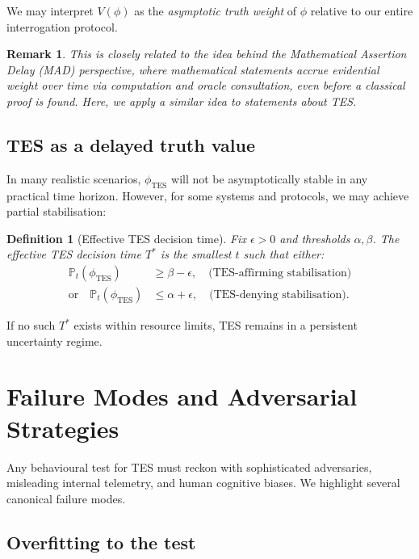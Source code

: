 \documentclass[11pt]{article}
\newtheorem{definition}{Definition}
\newtheorem{remark}{Remark}
\newcommand{\Pp}{\mathbb{P}}
\newcommand{\1}{\mathbf{1}}
\begin{document}
We may interpret $V(\phi)$ as the \emph{asymptotic truth weight} of $\phi$
relative to our entire interrogation protocol.

\begin{remark}
This is closely related to the idea behind the \emph{Mathematical Assertion
Delay} (MAD) perspective, where mathematical statements accrue evidential
weight over time via computation and oracle consultation, even before a
classical proof is found.
Here, we apply a similar idea to statements about TES.
\end{remark}

\subsection{TES as a delayed truth value}

In many realistic scenarios, $\phi_{\text{TES}}$ will not be asymptotically
stable in any practical time horizon.
However, for some systems and protocols, we may achieve partial stabilisation:

\begin{definition}[Effective TES decision time]
Fix $\epsilon > 0$ and thresholds $\alpha, \beta$.
The \emph{effective TES decision time} $T^*$ is the smallest $t$ such that
either:
\begin{align*}
  \Pp_t(\phi_{\text{TES}}) &\ge \beta - \epsilon,
  \quad\text{(TES-affirming stabilisation)}\\
  \text{or}\quad
  \Pp_t(\phi_{\text{TES}}) &\le \alpha + \epsilon,
  \quad\text{(TES-denying stabilisation).}
\end{align*}
\end{definition}

If no such $T^*$ exists within resource limits, TES remains in a persistent
uncertainty regime.

\section{Failure Modes and Adversarial Strategies}

Any behavioural test for TES must reckon with sophisticated adversaries,
misleading internal telemetry, and human cognitive biases.
We highlight several canonical failure modes.

\subsection{Overfitting to the test}
\end{document}
